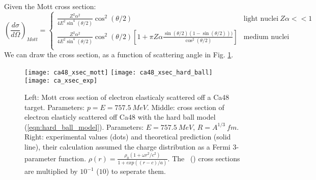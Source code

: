 Given the Mott cross section:
\begin{equation}
    \left( \frac{d\sigma}{d\Omega} \right)_{Mott} = 
    \begin{cases}
	\frac{Z^2 \alpha^2}{4E^2\sin^4(\theta/2)}\cos^2(\theta/2)   
	    & \text{light nuclei} \ Z\alpha << 1  \\
	\frac{Z^2 \alpha^2}{4E^2\sin^4(\theta/2)}\cos^2(\theta/2) \left[ 1 + \pi Z \alpha \frac{\sin(\theta/2)(1-\sin(\theta/2)))}{\cos^2(\theta/2)}\right]   
	    & \text{medium nuclei}  \\
    \end{cases}
\end{equation}
We can draw the cross section, as a function of scattering angle in Fig. \ref{fig:ca_xsec}.
\begin{figure}
    \texttt{[image: ca48\_xsec\_mott]}
    \texttt{[image: ca48\_xsec\_hard\_ball]}
    \texttt{[image: ca\_xsec\_exp]}
    \caption{Left: Mott cross section of electron elasticaly scattered off a Ca48
    target. Parameters: $p=E=757.5 \ MeV$.
    Middle: cross section of electron elasticly scattered off Ca48 with the hard ball
    model (\ref{eqn:hard_ball_model}). Parameters: $E =  757.5\ MeV$, $R=A^{1/3}\ fm$. 
    Right: experimental values (dots) and theoretical prediction (solid line),
    their calculation assumed the charge distribution as a Fermi 3-parameter function.
    $\rho(r) = \frac{\rho_0(1 + \omega r^2/c^2)}{1 + exp((r-c)/a)}$. The \Ca \ (\ca)
    cross sections are multiplied by $10^{-1}$ ($10$) to seperate them.  
    \cite{PhysRevLett.19.527}
    }
    \label{fig:ca_xsec}
\end{figure}

